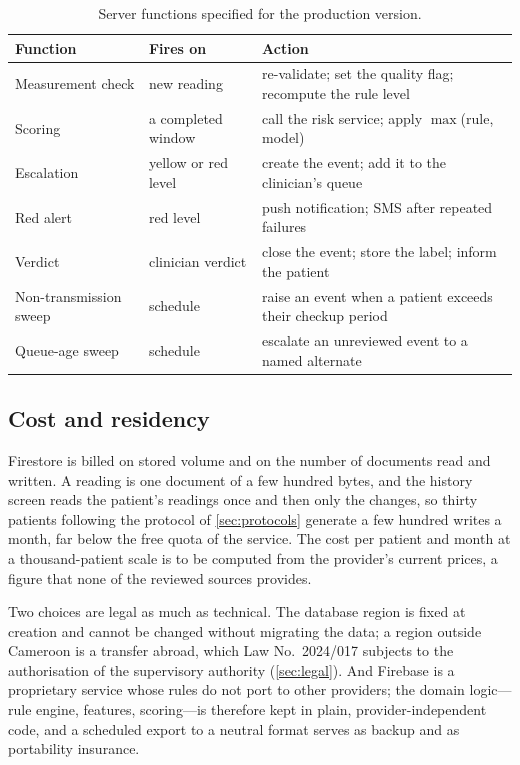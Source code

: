 \begin{table}[htbp]
\centering\footnotesize
\caption{Server functions specified for the production version.}\label{tab:triggers}\label{tab:modules}
\begin{tabularx}{\textwidth}{@{}>{\raggedright\arraybackslash}p{3.4cm} >{\raggedright\arraybackslash}p{3.0cm} X@{}}
\toprule
\textbf{Function} & \textbf{Fires on} & \textbf{Action} \\
\midrule
Measurement check & new reading & re-validate; set the quality flag; recompute the rule level \\
Scoring & a completed window & call the risk service; apply $\max$(rule, model) \\
Escalation & yellow or red level & create the event; add it to the clinician's queue \\
Red alert & red level & push notification; SMS after repeated failures \\
Verdict & clinician verdict & close the event; store the label; inform the patient \\
Non-transmission sweep & schedule & raise an event when a patient exceeds their checkup period \parencite{yazdani2018} \\
Queue-age sweep & schedule & escalate an unreviewed event to a named alternate \\
\bottomrule
\end{tabularx}
\end{table}

\subsection{Cost and residency}\label{sec:sync}\label{sec:connections}\label{sec:connection-cost}\label{sec:cost}\label{sec:modules}\label{sec:residency-irreversible}

Firestore is billed on stored volume and on the number of documents read and written. A reading is one document of a few hundred bytes, and the history screen reads the patient's readings once and then only the changes, so thirty patients following the protocol of \cref{sec:protocols} generate a few hundred writes a month, far below the free quota of the service. The cost per patient and month at a thousand-patient scale is to be computed from the provider's current prices, a figure that none of the reviewed sources provides.

Two choices are legal as much as technical. The database region is fixed at creation and cannot be changed without migrating the data; a region outside Cameroon is a transfer abroad, which Law No.~2024/017 subjects to the authorisation of the supervisory authority (\cref{sec:legal}). And Firebase is a proprietary service whose rules do not port to other providers; the domain logic---rule engine, features, scoring---is therefore kept in plain, provider-independent code, and a scheduled export to a neutral format serves as backup and as portability insurance.

